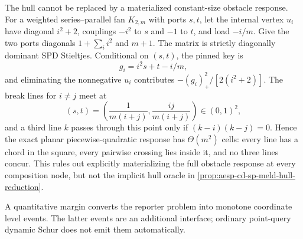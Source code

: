 

The hull cannot be replaced by a materialized constant-size obstacle response.
For a weighted series--parallel fan $K_{2,m}$ with ports $s,t$, let the
internal vertex $u_i$ have diagonal $i^2+2$, couplings $-i^2$ to $s$ and
$-1$ to $t$, and load $-i/m$.  Give the two ports diagonals
$1+\sum_i i^2$ and $m+1$.  The matrix is strictly diagonally dominant SPD
Stieltjes.  Conditional on $(s,t)$, the pinned key is
\begin{equation*}
 g_i=i^2s+t-i/m,
\end{equation*}
and eliminating the nonnegative $u_i$ contributes
$-(g_i)_+^2/[2(i^2+2)]$.  The break lines for $i\neq j$ meet at
\begin{equation*}
 (s,t)=\left(\frac1{m(i+j)},\frac{ij}{m(i+j)}\right)\in(0,1)^2,
\end{equation*}
and a third line $k$ passes through this point only if
$(k-i)(k-j)=0$.  Hence the exact planar piecewise-quadratic response has
$\Theta(m^2)$ cells: every line has a chord in the square, every pairwise
crossing lies inside it, and no three lines concur.  This rules out explicitly materializing the full
obstacle response at every composition node, but not the implicit hull oracle
in \cref{prop:aesp-cd-sp-meld-hull-reduction}.

A quantitative margin converts the reporter problem into monotone coordinate
level events.  The latter events are an additional interface; ordinary
point-query dynamic Schur does not emit them automatically.

